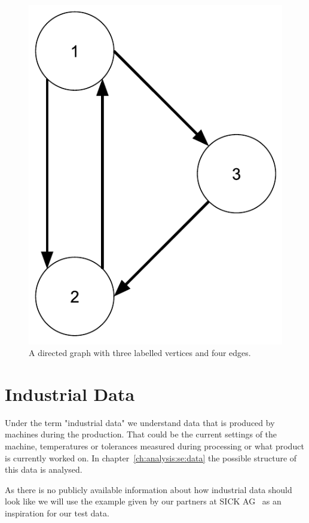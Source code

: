 \begin{figure}[h]
  \centering
  \includegraphics[width=\textwidth/4]{images/simpleGraph}
  \caption{A directed graph with three labelled vertices and four edges.}
  \label{fig:simpleGraph}
\end{figure}

\section{Industrial Data}
\label{ch:background:se:industrialData}
Under the term "industrial data" we understand data that is produced by machines during the production.
That could be the current settings of the machine,
temperatures or tolerances measured during processing or what product is currently worked on.
In chapter~\ref{ch:analysis:se:data} the possible structure of this data is analysed.

As there is no publicly available information about how industrial data should look like we will use the example given by our partners at SICK AG~\cite{SICK} as an inspiration for our test data.

